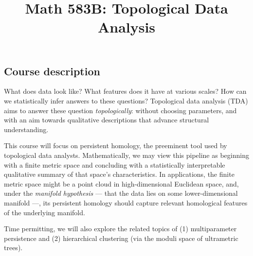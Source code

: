 \documentclass[11pt,twoside]{amsart}
\title{Math 583B: Topological Data Analysis}
\begin{document}
\maketitle

\thispagestyle{empty}

\vspace{-.5cm}

\begin{center}
\end{center}

\smallskip

\subsection*{Course description}
What does data look like? What features does it have at various scales? How can we statistically infer answers to these questions? Topological data analysis (TDA) aims to answer these question \emph{topologically}: without choosing parameters, and with an aim towards qualitative descriptions that advance structural understanding.

This course will focus on persistent homology, the preeminent tool used by topological data analysts. Mathematically, we may view this pipeline as beginning with a finite metric space and concluding with a statistically interpretable qualitative summary of that space's characteristics. In applications, the finite metric space might be a point cloud in high-dimensional Euclidean space, and, under the \emph{manifold hypothesis} --- that the data lies on some lower-dimensional manifold ---, its persistent homology should capture relevant homological features of the underlying manifold.

Time permitting, we will also explore the related topics of (1) multiparameter persistence and (2) hierarchical clustering (via the moduli space of ultrametric trees).
\end{document}
